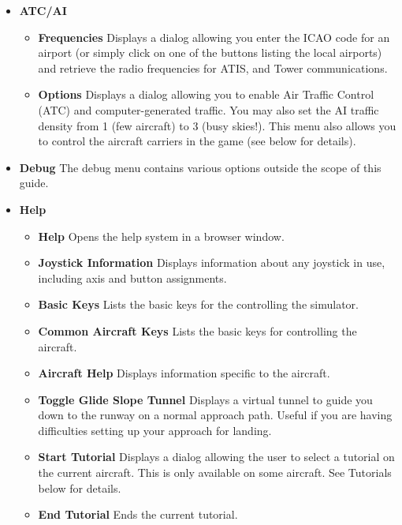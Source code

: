 \begin{itemize}
\item \textbf{ATC/AI} 
 \begin{itemize}
  \item \textbf{Frequencies}  Displays a dialog allowing you enter the ICAO code
for an airport 
  (or simply click on one of the buttons listing the local airports) and
retrieve the radio 
  frequencies for ATIS, and Tower communications.
  \item \textbf{Options}  Displays a dialog allowing you to enable Air Traffic
Control (ATC) and 
  computer-generated traffic. You may also set the AI traffic density from 1
(few aircraft) to 3 (busy skies!). 
  This menu also allows you to control the aircraft carriers in the game (see
below for details).
 \end{itemize}
   
\item \textbf{Debug} The debug menu contains various options
outside the scope of this guide.
 
 \item \textbf{Help}
 \begin{itemize}
 \item \textbf{Help} Opens the help system in a browser window.
 \item \textbf{Joystick Information} Displays information about any joystick 
 in use, including axis and button assignments.  
 \item \textbf{Basic Keys} Lists the basic keys for the controlling the
simulator.
 \item \textbf{Common Aircraft Keys} Lists the basic keys for controlling the
aircraft.
 \item \textbf{Aircraft Help} Displays information specific to the aircraft.
 \item \textbf{Toggle Glide Slope Tunnel} Displays a virtual tunnel to guide 
 you down to the runway on a normal approach path. Useful if you are having
 difficulties setting up your approach for landing.
 \item \textbf{Start Tutorial} Displays a dialog allowing the user to select a
tutorial on the current aircraft. 
 This is only available on some aircraft. See Tutorials below for details.
 \item \textbf{End Tutorial}  Ends the current tutorial.
 \end{itemize}
\end{itemize}

